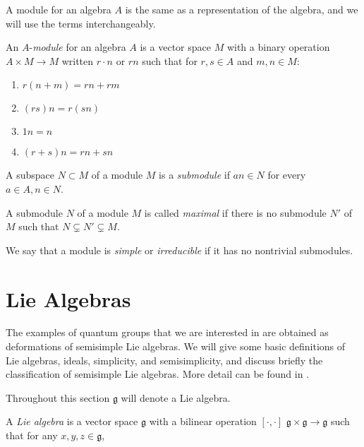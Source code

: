 A module for an algebra $A$ is the same as a representation of the algebra, and
we will use the terms interchangeably. 

\begin{defn}
    An $A$-\emph{module} for an algebra $A$ is a vector space $M$ with a binary
    operation $A \times M \to M$ written $r\cdot n$ or $rn$ such that for $r,s
    \in A$ and $m,n \in M$:

    \begin{enumerate}
        \item $r(n + m) = rn + rm$
        \item $(rs)n = r(sn)$
        \item $1n = n$
        \item $(r+s)n = rn + sn$
    \end{enumerate}
\end{defn}

\begin{defn}
    A subspace $N \subset M$ of a module $M$ is a \emph{submodule} if $an \in
    N$ for every $a \in A, n\in N$.
\end{defn}

\begin{defn}
    A submodule $N$ of a module $M$ is called \emph{maximal} if there is no
    submodule $N'$ of $M$ such that $N \subsetneq N' \subsetneq M$.
\end{defn}

\begin{defn}
    We say that a module is \emph{simple} or \emph{irreducible} if it has no
    nontrivial submodules.
\end{defn}

\section{Lie Algebras}

The examples of quantum groups that we are interested in are obtained as
deformations of semisimple Lie algebras. We will give some basic definitions of
Lie algebras, ideals, simplicity, and semisimplicity, and discuss briefly the
classification of semisimple Lie algebras. More detail can be found in
\cite{Humphreys1973}.

Throughout this section $\mathfrak{g}$ will denote a Lie algebra.

A \emph{Lie algebra} is a vector space $\mathfrak{g}$ with a bilinear operation
$\left[ \cdot, \cdot \right]$  $\mathfrak{g} \times \mathfrak{g} \to
\mathfrak{g}$ such that for any $x,y,z\in \mathfrak{g}$,

